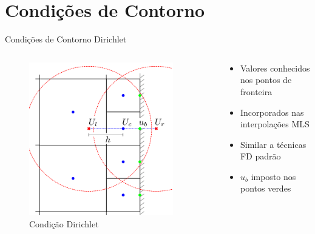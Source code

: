 \documentclass[../main/main.tex]{subfiles}
\begin{document}
\section{Condições de Contorno}

\begin{frame}{Condições de Contorno Dirichlet}
\begin{columns}[T]
\begin{column}{0.5\textwidth}
\begin{figure}
\centering
\includegraphics[width=0.9\textwidth]{imgs/figura3a.png}
\caption{Condição Dirichlet}
\end{figure}
\end{column}
\begin{column}{0.5\textwidth}
\begin{itemize}
\item Valores conhecidos nos pontos de fronteira
\item Incorporados nas interpolações MLS
\item Similar a técnicas FD padrão
\item $u_b$ imposto nos pontos verdes
\end{itemize}
\end{column}
\end{columns}
\end{frame}
\end{document}
